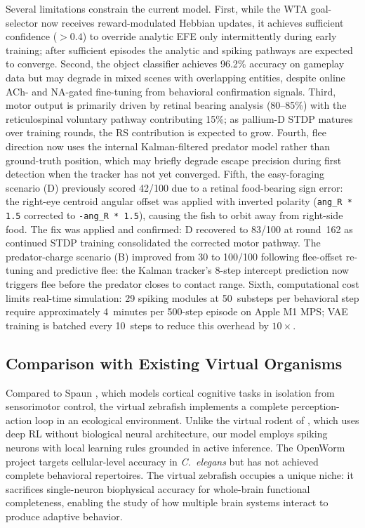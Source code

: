 \documentclass[12pt]{article}
\begin{document}
Several limitations constrain the current model.
First, while the WTA goal-selector now receives reward-modulated
Hebbian updates, it achieves sufficient confidence ($>0.4$) to
override analytic EFE only intermittently during early training;
after sufficient episodes the analytic and spiking pathways are
expected to converge.
Second, the object classifier achieves 96.2\% accuracy on gameplay
data but may degrade in mixed scenes with overlapping entities,
despite online ACh- and NA-gated fine-tuning from behavioral
confirmation signals.
Third, motor output is primarily driven by retinal bearing analysis
(80--85\%) with the reticulospinal voluntary pathway contributing
15\%; as pallium-D STDP matures over training rounds, the RS
contribution is expected to grow.
Fourth, flee direction now uses the internal Kalman-filtered
predator model rather than ground-truth position, which may
briefly degrade escape precision during first detection when the
tracker has not yet converged.
Fifth, the easy-foraging scenario (D) previously scored 42/100 due to
a retinal food-bearing sign error: the right-eye centroid angular offset
was applied with inverted polarity (\texttt{ang\_R * 1.5} corrected to
\texttt{-ang\_R * 1.5}), causing the fish to orbit away from right-side
food.
The fix was applied and confirmed: D recovered to 83/100 at round~162
as continued STDP training consolidated the corrected motor pathway.
The predator-charge scenario (B) improved from 30 to 100/100
following flee-offset re-tuning and predictive flee: the Kalman
tracker's 8-step intercept prediction now triggers flee before
the predator closes to contact range.
Sixth, computational cost limits real-time simulation: 29 spiking
modules at 50~substeps per behavioral step require approximately
4~minutes per 500-step episode on Apple M1 MPS; VAE training
is batched every 10~steps to reduce this overhead by $10\times$.

\subsection{Comparison with Existing Virtual Organisms}

Compared to Spaun \citep{eliasmith2012}, which models cortical
cognitive tasks in isolation from sensorimotor control, the virtual
zebrafish implements a complete perception-action loop in an
ecological environment.
Unlike the virtual rodent of \citet{merel2019}, which uses deep RL
without biological neural architecture, our model employs spiking
neurons with local learning rules grounded in active inference.
The OpenWorm project \citep{openworm2014} targets cellular-level
accuracy in \textit{C.\ elegans} but has not achieved complete
behavioral repertoires.
The virtual zebrafish occupies a unique niche: it sacrifices
single-neuron biophysical accuracy for whole-brain functional
completeness, enabling the study of how multiple brain systems
interact to produce adaptive behavior.
\end{document}
